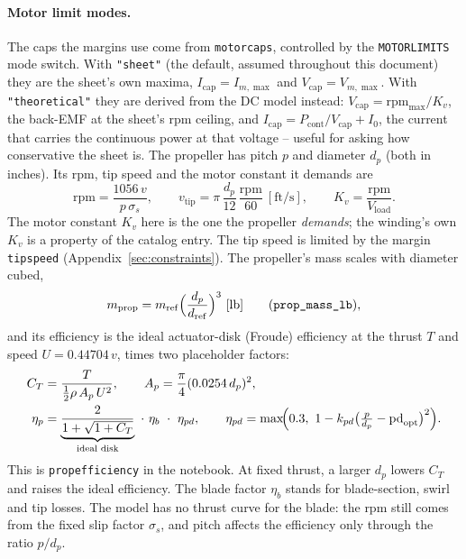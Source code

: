 \documentclass[11pt,a4paper]{article}
\renewcommand{\_}{\textunderscore\allowbreak}
\newcommand{\code}[1]{\texttt{#1}}
\newcommand{\Vload}{V_{\mathrm{load}}}
\begin{document}
\paragraph{Motor limit modes.} The caps the margins use come from \code{motor\_caps}, controlled by the
\code{MOTOR\_LIMITS} mode switch. With \code{"sheet"} (the default, assumed throughout this document) they are
the sheet's own maxima, $I_{\mathrm{cap}}=I_{m,\max}$ and $V_{\mathrm{cap}}=V_{m,\max}$. With
\code{"theoretical"} they are derived from the DC model instead: $V_{\mathrm{cap}}=\mathrm{rpm}_{\max}/K_v$,
the back-EMF at the sheet's rpm ceiling, and $I_{\mathrm{cap}}=P_{\mathrm{cont}}/V_{\mathrm{cap}}+I_0$, the
current that carries the continuous power at that voltage -- useful for asking how conservative the sheet is.
The propeller has pitch $p$ and diameter $d_p$ (both in inches). Its rpm, tip speed and the motor constant it demands are
\begin{equation}
  \mathrm{rpm} = \frac{1056\,v}{p\,\sigma_s}, \qquad
  v_{\mathrm{tip}} = \pi\,\frac{d_p}{12}\,\frac{\mathrm{rpm}}{60}\ [\mathrm{ft/s}], \qquad
  K_v = \frac{\mathrm{rpm}}{\Vload}.
  \label{eq:prop}
\end{equation}
The motor constant $K_v$ here is the one the propeller \emph{demands}; the winding's own $K_v$ is a property of the catalog entry. The tip speed is limited by the margin \code{tip\_speed} (Appendix~\ref{sec:constraints}). The propeller's mass scales with diameter cubed,
\begin{equation}
  m_{\mathrm{prop}} = m_{\mathrm{ref}}\Bigl(\frac{d_p}{d_{\mathrm{ref}}}\Bigr)^{3}\ [\mathrm{lb}] \qquad (\code{prop\_mass\_lb}),
  \label{eq:propmass}
\end{equation}
and its efficiency is the ideal actuator-disk (Froude) efficiency at the thrust $T$ and speed $U=0.44704\,v$, times two placeholder factors:
\begin{align}
  C_T &= \frac{T}{\tfrac12\rho\,A_p\,U^2}, \qquad A_p=\frac{\pi}{4}(0.0254\,d_p)^2, \label{eq:propct}\\
  \eta_p &= \underbrace{\frac{2}{1+\sqrt{1+C_T}}}_{\text{ideal disk}}\ \cdot\ \eta_b\ \cdot\ \eta_{pd},
  \qquad \eta_{pd}=\max\!\Bigl(0.3,\ 1-k_{pd}\bigl(\tfrac{p}{d_p}-\mathrm{pd}_{\mathrm{opt}}\bigr)^2\Bigr).
  \label{eq:propeff}
\end{align}
This is \code{prop\_efficiency} in the notebook.
At fixed thrust, a larger $d_p$ lowers $C_T$ and raises the ideal efficiency. The blade factor $\eta_b$ stands for blade-section, swirl and tip losses.
The model has no thrust curve for the blade: the rpm still comes from the fixed slip factor $\sigma_s$, and pitch affects the efficiency only through the ratio $p/d_p$.
\end{document}
